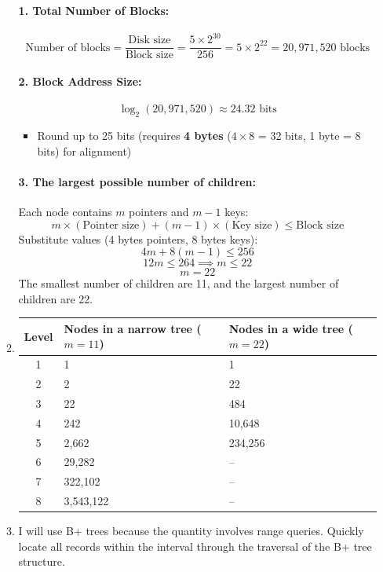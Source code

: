 \documentclass[12pt]{extarticle}
\begin{document}
\begin{flushleft}
\begin{enumerate}
\begin{enumerate}
\paragraph{1. Total Number of Blocks:}
\[
\text{Number of blocks} = \frac{\text{Disk size}}{\text{Block size}} = \frac{5 \times 2^{30}}{256} = 5 \times 2^{22} = 20,\!971,\!520 \text{ blocks}
\]

\paragraph{2. Block Address Size:}
\[
\log_2(20,\!971,\!520) \approx 24.32 \text{ bits}
\]
\begin{itemize}
    \item Round up to 25 bits (requires \textbf{4 bytes} (\(4 \times 8\) = 32 bits, 1 byte = 8 bits) for alignment)
\end{itemize}

\paragraph{3. The largest possible number of children:}
Each node contains \(m\) pointers and \(m-1\) keys:
\[
m \times (\text{Pointer size}) + (m-1) \times (\text{Key size}) \leq \text{Block size}
\]
Substitute values (4 bytes pointers, 8 bytes keys):
\[
4m + 8(m-1) \leq 256
\]
\[
12m \leq 264 \implies m \leq 22
\]
\[
\boxed{m = 22}
\]
The smallest number of children are 11, and the largest number of children are 22.

\item

\begin{tabular}{cll}
\toprule
\textbf{Level} & \textbf{Nodes in a narrow tree (\(m=11\))} & \textbf{Nodes in a wide tree (\(m=22\))} \\
\midrule
1     & 1          & 1          \\
2     & 2          & 22         \\
3     & 22         & 484        \\
4     & 242        & 10,648     \\
5     & 2,662      & 234,256    \\
6     & 29,282     & --\\
7     & 322,102    & --\\
8     & 3,543,122  & --\\
\bottomrule
\end{tabular}

\item I will use B+ trees because the quantity involves range queries. Quickly locate all records within the interval through the traversal of the B+ tree structure.


\end{enumerate}
\end{enumerate}
\end{flushleft}
\end{document}

